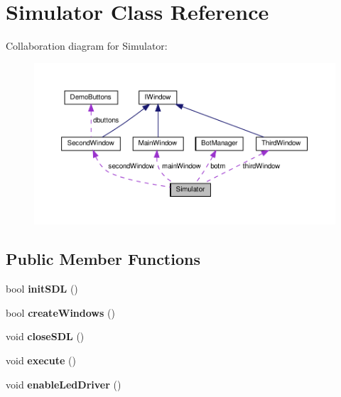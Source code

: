 \hypertarget{classSimulator}{}\section{Simulator Class Reference}
\label{classSimulator}


Collaboration diagram for Simulator\+:
\nopagebreak
\begin{figure}[H]
\begin{center}
\leavevmode
\includegraphics[width=350pt]{classSimulator__coll__graph}
\end{center}
\end{figure}
\subsection*{Public Member Functions}
\begin{DoxyCompactItemize}
\item 
\mbox{\label{classSimulator_a7b09e3b0467d4e84529086b1d7a100ea}} 
bool {\bfseries init\+S\+DL} ()
\item 
\mbox{\label{classSimulator_a74a1402122a5c87ac5a0e22caa41fbe1}} 
bool {\bfseries create\+Windows} ()
\item 
\mbox{\label{classSimulator_a61e7a23f8a1abe070a0d988c433b4617}} 
void {\bfseries close\+S\+DL} ()
\item 
\mbox{\label{classSimulator_ac9a61a018be416c43f5496f230a268d6}} 
void {\bfseries execute} ()
\item 
\mbox{\label{classSimulator_a50f038e5b2063f8ea0070d1b7eaa8e52}} 
void {\bfseries enable\+Led\+Driver} ()
\end{DoxyCompactItemize}
